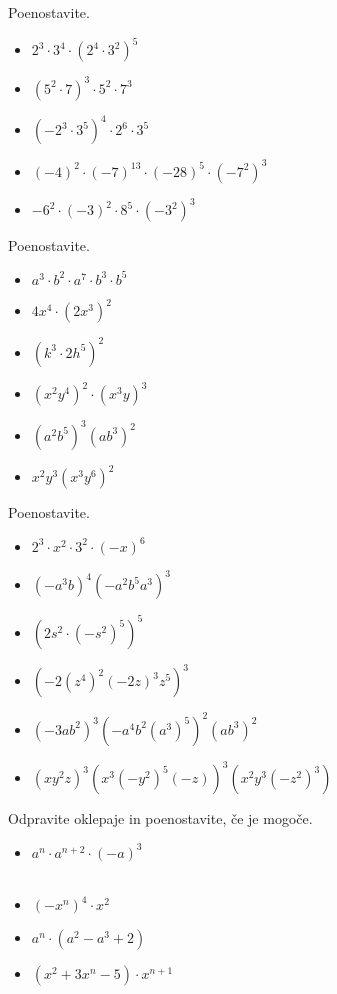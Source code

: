         \begin{naloga}
            Poenostavite.
            \begin{itemize}
                \item $2^3\cdot 3^4\cdot(2^4\cdot 3^2)^5$ 
                \item $(5^2\cdot 7)^3\cdot 5^2\cdot 7^3$ 
                \item $(-2^3\cdot 3^5)^4\cdot 2^6\cdot 3^5$ 
                \item $(-4)^2\cdot(-7)^{13}\cdot (-28)^5\cdot (-7^2)^3$ 
                \item $-6^2\cdot(-3)^2\cdot 8^5\cdot (-3^2)^3$ 
            \end{itemize}
        \end{naloga}

        \begin{naloga}
            Poenostavite.
            \begin{itemize}
                \item $a^3\cdot b^2\cdot a^7\cdot b^3\cdot b^5$ 
                \item $4x^4\cdot(2x^3)^2$ 
                \item $(k^3\cdot 2h^5)^2$ 
                \item $(x^2y^4)^2\cdot (x^3y)^3$ 
                \item $(a^2b^5)^3(ab^3)^2$ 
                \item $x^2y^3(x^3y^6)^2$ 
            \end{itemize}
        \end{naloga}

    
        \begin{naloga}
            Poenostavite.
            \begin{itemize}
                \item $2^3\cdot x^2\cdot 3^2\cdot(-x)^6$ 
                \item $(-a^3b)^4(-a^2b^5a^3)^3$ 
                \item $(2s^2\cdot(-s^2)^5)^5$ 
                \item $(-2(z^4)^2(-2z)^3z^5)^3$ 
                \item $(-3ab^2)^3(-a^4b^2(a^3)^5)^2(ab^3)^2$ 
                \item $(xy^2z)^3(x^3(-y^2)^5(-z))^3(x^2y^3(-z^2)^3)$ 
            \end{itemize}
        \end{naloga}

        \begin{naloga}
            Odpravite oklepaje in poenostavite, če je mogoče.
            \begin{itemize}
                \item $a^n\cdot a^{n+2}\cdot(-a)^3$ \\ ~
                \item $(-x^n)^4\cdot x^2$ 
                \item $a^n\cdot(a^2-a^3+2)$ 
                \item $(x^2+3x^n-5)\cdot x^{n+1}$ 
            \end{itemize}
        \end{naloga}


